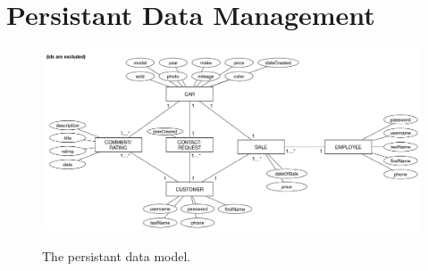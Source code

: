 \section{Persistant Data Management}
\begin{figure}[h!]
	\centering
		\includegraphics[scale=0.35]{Figures/PersistentDataModel}\\
	\caption{The persistant data model.}
  \label{fig:LabelName}
\end{figure}